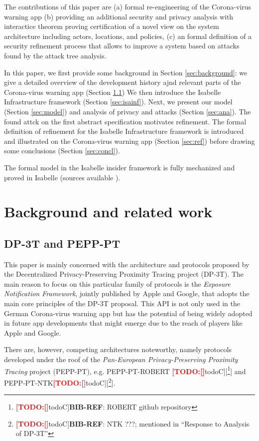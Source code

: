 \documentclass{llncs}
\newcommand{\TODO}[1]{\textcolor{red}{\textbf{[TODO:#1]}}}
\newcommand*{\TODOfn}[2][noteC]{\TODO[#1]{[\footnote{\TODO[#1]{#2}}]}}
\newcommand*{\TODOref}[2][todoC]{\TODOfn[#1]{\textbf{BIB-REF}: #2}}
\begin{document}
The contributions of this paper are (a) formal re-engineering of the Corona-virus warning app
(b) providing an additional security and privacy analysis with interactice theorem proving
certification of a novel view on the system architecture including actors, locations, and policies,
(c) an formal definition of a security refinement process that allows to improve a system
based on attacks found by the attack tree analysis.


In this paper, we first provide some background in Section \ref{sec:background}:
we give a detailed overview of the development history %
ajnd relevant parts of the Corona-virus warning app (Section \ref{sec:history})
We then introduce the Isabelle Infrastructure framework (Section \ref{sec:isainf}).
Next, we present our model (Section \ref{sec:model}) and analysis of privacy and
attacks (Section \ref{sec:ana}). The found attck on the first abstract specification
motivates refinement. The formal definition of refinement for the Isabelle Infrastructure
framework is introduced and illustrated on the Corona-virus warning app (Section \ref{sec:ref})
before drawing some conclusions (Section \ref{sec:concl}).

The formal model in the Isabelle insider framework is fully mechanized and proved in
Isabelle (sources available \cite{kam:18smc}). 

\section{Background and related work}

\subsection{DP-3T and PEPP-PT}
\label{sec:history}
This paper is mainly concerned with the architecture and protocols proposed by the
Decentralized Privacy-Preserving Proximity Tracing project (DP-3T).
The main reason to focus on this particular family of protocols is the
\textit{Exposure Notification Framework}, jointly published by Apple and Google, that adopts
the main core principles of the DP-3T proposal. This API is not only used in the German
Corona-virus warning app but has the potential of being widely adopted in future
app developments that might emerge due to the reach of players like Apple and Google.

There are, however, competing architectures noteworthy, namely protocols developed under the
roof of the \textit{Pan-European Privacy-Preserving Proximity Tracing} project (PEPP-PT), e.g.
PEPP-PT-ROBERT \TODOref{ROBERT github repository} and PEPP-PT-NTK\TODOref{NTK ???; mentioned in
  ``Response to Analysis of DP-3T''}.
\end{document}
